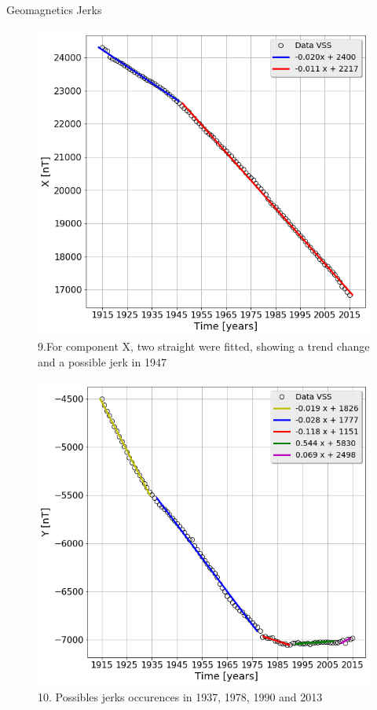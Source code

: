 \documentclass[final,t]{beamer}
\begin{document}
\begin{columns}[t]
\begin{column}{.25\linewidth}
\begin{block}{Geomagnetics Jerks}
		\centering
		\begin{figure}
			\centering
			\includegraphics[scale=0.8]{"figs_ed/Linear regression X_v3"}
			\caption{\small 9.For component X, two straight were fitted, showing a trend change and a possible jerk in 1947}
			\label{fig:LinearregressionX_v2}
		\end{figure}
		
		
		\begin{figure}
			\centering
			\includegraphics[scale=0.8]{"figs_ed/Linear regression Y_v3"}
			\caption{\small 10. Possibles jerks occurences in 1937, 1978, 1990 and 2013}
			\label{fintetico}
		\end{figure}	
		

\end{block}
\end{column}
\end{columns}
\end{document}
